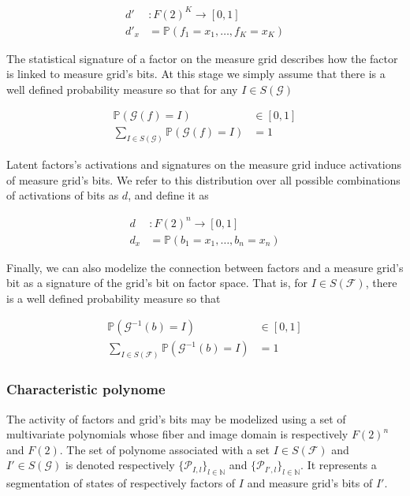\documentclass[a4paper, 11pt]{article}
\begin{document}
\begin{align*}
d' &: F(2)^{K} \rightarrow [0,1]\\
d'_x &= \mathbb{P}\left(f_1 = x_1, \ldots, f_K = x_K \right)
\end{align*}

The statistical signature of a factor on the measure grid describes how the factor is linked to measure grid's bits. At this stage we simply assume that there is a well defined probability measure so that for any $I \in S(\mathcal{G})$

\begin{align*}
\mathbb{P}(\mathcal{G}(f) = I) &\in [0, 1]\\
\sum_{I \in S(\mathcal{G})} \mathbb{P}(\mathcal{G}(f) = I) &=1
\end{align*}

Latent factors's activations and signatures on the measure grid induce activations of measure grid's bits. We refer to this distribution over all possible combinations of activations of bits as $d$, and define it as

\begin{align*}
d &: F(2)^{n} \rightarrow [0,1]\\
d_x &= \mathbb{P}\left(b_1 = x_1, \ldots, b_n = x_n \right)
\end{align*}

Finally, we can also modelize the connection between factors and a measure grid's bit as a signature of the grid's bit on factor space. That is, for $I \in S(\mathcal{F})$, there is a well defined probability measure so that 

\begin{align*}
\mathbb{P}(\mathcal{G}^{-1}(b) = I) &\in [0, 1]\\
\sum_{I \in S(\mathcal{F})} \mathbb{P}(\mathcal{G}^{-1}(b) = I) &=1
\end{align*}


\subsubsection*{Characteristic polynome}

The activity of factors and grid's bits may be modelized using a set of multivariate polynomials whose fiber and image domain is respectively $F(2)^{n}$ and $F(2)$. The set of polynome associated with a set $I \in S(\mathcal{F})$ and $I' \in S(\mathcal{G})$ is denoted respectively $\lbrace \mathcal{P}_{I, l} \rbrace_{l \in \mathbb{N}}$  and $\lbrace \mathcal{P}_{I', l} \rbrace_{l \in \mathbb{N}}$. It represents a segmentation of states of respectively factors of $I$ and measure grid's bits of $I'$.
\end{document}
